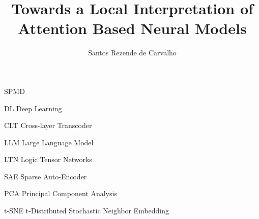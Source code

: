 \documentclass[ppgc,prop-tese,english]{iiufrgs}
\title{Towards a Local Interpretation of Attention Based Neural Models}
\author{Santos Rezende de Carvalho}{Breno William}
\begin{document}
\maketitle

\clearpage


\listoffigures

\listoftables

\begin{listofabbrv}{SPMD}
        \item[DL]   Deep Learning
        
        \item[CLT]  Cross-layer Transcoder
        \item[LLM]  Large Language Model
        \item[LTN]  Logic Tensor Networks
        \item[SAE]  Sparse Auto-Encoder
        \item[PCA]  Principal Component Analysis
        
        \item[t-SNE]  t-Distributed Stochastic Neighbor Embedding
\end{listofabbrv}


\tableofcontents

%     

\end{document}

